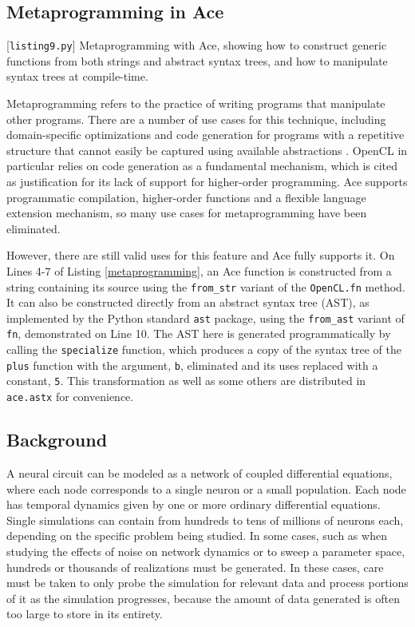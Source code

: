 \documentclass[9pt,preprint]{sigplanconf}
\begin{document}
\subsection{Metaprogramming in Ace}
\begin{codelisting}

\caption{[\texttt{listing9.py}] Metaprogramming with Ace, showing how to construct generic functions from both strings and abstract syntax trees, and how to manipulate syntax trees at compile-time.}
\label{metaprogramming}
\end{codelisting}
Metaprogramming refers to the practice of writing programs that manipulate other programs. There are a number of use cases for this technique, including domain-specific optimizations and code generation for programs with a repetitive structure that cannot easily be captured using available abstractions \cite{klockner2011pycuda}. OpenCL in particular relies on code generation as a fundamental mechanism, which is cited as justification for its lack of support for higher-order programming. Ace supports programmatic compilation, higher-order functions and a flexible language extension mechanism, so many use cases for metaprogramming have been eliminated. 

However, there are still valid uses for this feature and Ace fully supports it. On Lines 4-7 of Listing \ref{metaprogramming}, an Ace function is constructed from a string containing its source using the \verb|from_str| variant of the \verb|OpenCL.fn| method. It can also be constructed directly from an abstract syntax tree (AST), as implemented by the Python standard \verb|ast| package, using the \verb|from_ast| variant of \verb|fn|, demonstrated on Line 10. The AST here is generated programmatically by calling the \verb|specialize| function, which produces a copy of the syntax tree of the \verb|plus| function with the argument, \verb|b|, eliminated and its uses replaced with a constant, \verb|5|. This transformation as well as some others are distributed in \verb|ace.astx| for convenience.


\subsection{Background}
A neural circuit can be modeled as a network of coupled differential equations, where each node corresponds to a single neuron or a small population. Each node has temporal dynamics given by one or more ordinary differential equations. Single simulations can contain from hundreds to tens of millions of neurons each, depending on the specific problem being studied. In some cases, such as when studying the effects of noise on network dynamics or to sweep a parameter space, hundreds or thousands of realizations must be generated. In these cases, care must be taken to only probe the simulation for relevant data and process portions of it as the simulation progresses, because the amount of data generated is often too large to store in its entirety.
\end{document}
